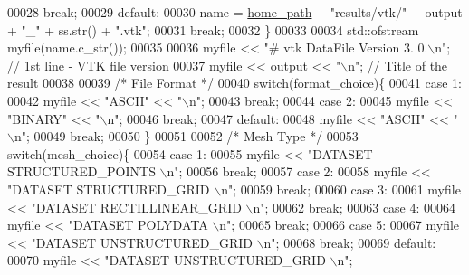 \begin{DoxyCode}
00028         \textcolor{keywordflow}{break};
00029     \textcolor{keywordflow}{default}:
00030         name = \hyperlink{_global_variables_8h_a556ce46e457f991c51f3dac111579e2b}{home\_path} + \textcolor{stringliteral}{"results/vtk/"} + output + \textcolor{stringliteral}{"\_"} + ss.str() + \textcolor{stringliteral}{".vtk"};
00031         \textcolor{keywordflow}{break};
00032     \}
00033 
00034     std::ofstream myfile(name.c\_str());
00035 
00036     myfile << \textcolor{stringliteral}{"# vtk DataFile Version 3. 0.\(\backslash\)n"}; \textcolor{comment}{// 1st line - VTK file version}
00037     myfile << output << \textcolor{stringliteral}{"\(\backslash\)n"}; \textcolor{comment}{// Title of the result}
00038 
00039     \textcolor{comment}{/* File Format */}
00040     \textcolor{keywordflow}{switch}(format\_choice)\{
00041     \textcolor{keywordflow}{case} 1:
00042         myfile << \textcolor{stringliteral}{"ASCII"} << \textcolor{stringliteral}{"\(\backslash\)n"};
00043         \textcolor{keywordflow}{break};
00044     \textcolor{keywordflow}{case} 2:
00045         myfile << \textcolor{stringliteral}{"BINARY"} << \textcolor{stringliteral}{"\(\backslash\)n"};
00046         \textcolor{keywordflow}{break};
00047     \textcolor{keywordflow}{default}:
00048         myfile << \textcolor{stringliteral}{"ASCII"} << \textcolor{stringliteral}{"\(\backslash\)n"};
00049         \textcolor{keywordflow}{break};
00050     \}
00051 
00052     \textcolor{comment}{/* Mesh Type */}
00053     \textcolor{keywordflow}{switch}(mesh\_choice)\{
00054     \textcolor{keywordflow}{case} 1:
00055         myfile << \textcolor{stringliteral}{"DATASET STRUCTURED\_POINTS \(\backslash\)n"};
00056         \textcolor{keywordflow}{break};
00057     \textcolor{keywordflow}{case} 2:
00058         myfile << \textcolor{stringliteral}{"DATASET STRUCTURED\_GRID \(\backslash\)n"};
00059         \textcolor{keywordflow}{break};
00060     \textcolor{keywordflow}{case} 3:
00061         myfile << \textcolor{stringliteral}{"DATASET RECTILLINEAR\_GRID \(\backslash\)n"};
00062         \textcolor{keywordflow}{break};
00063     \textcolor{keywordflow}{case} 4:
00064         myfile << \textcolor{stringliteral}{"DATASET POLYDATA \(\backslash\)n"};
00065         \textcolor{keywordflow}{break};
00066     \textcolor{keywordflow}{case} 5:
00067         myfile << \textcolor{stringliteral}{"DATASET UNSTRUCTURED\_GRID \(\backslash\)n"};
00068         \textcolor{keywordflow}{break};
00069     \textcolor{keywordflow}{default}:
00070         myfile << \textcolor{stringliteral}{"DATASET UNSTRUCTURED\_GRID \(\backslash\)n"};

\end{DoxyCode}
